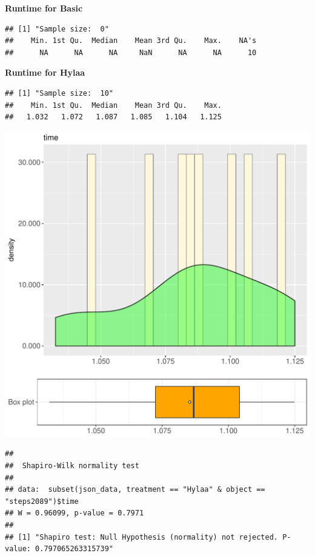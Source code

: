 \documentclass{article}\usepackage[]{graphicx}\usepackage[]{color}
\makeatletter
\def\maxwidth{ %
  \ifdim\Gin@nat@width>\linewidth
    \linewidth
  \else
    \Gin@nat@width
  \fi
}
\newenvironment{kframe}{%
 \def\at@end@of@kframe{}%
 \ifinner\ifhmode%
  \def\at@end@of@kframe{\end{minipage}}%
  \begin{minipage}{\columnwidth}%
 \fi\fi%
 \def\FrameCommand##1{\hskip\@totalleftmargin \hskip-\fboxsep
 \colorbox{shadecolor}{##1}\hskip-\fboxsep
     \hskip-\linewidth \hskip-\@totalleftmargin \hskip\columnwidth}%
 \MakeFramed {\advance\hsize-\width
   \@totalleftmargin\z@ \linewidth\hsize
   \@setminipage}}%
 {\par\unskip\endMakeFramed%
 \at@end@of@kframe}
\newenvironment{knitrout}{}{} %
\makeatother
\begin{document}
 \textbf{Runtime for Basic}
\begin{knitrout}
\color{fgcolor}\begin{kframe}
\begin{verbatim}
## [1] "Sample size:  0"
##    Min. 1st Qu.  Median    Mean 3rd Qu.    Max.    NA's 
##      NA      NA      NA     NaN      NA      NA      10
\end{verbatim}
\end{kframe}
\end{knitrout}
 \textbf{Runtime for Hylaa}
\begin{knitrout}
\color{fgcolor}\begin{kframe}
\begin{verbatim}
## [1] "Sample size:  10"
##    Min. 1st Qu.  Median    Mean 3rd Qu.    Max. 
##   1.032   1.072   1.087   1.085   1.104   1.125
\end{verbatim}
\end{kframe}
\includegraphics[width=\maxwidth]{figure/RH3_Hylaa_steps2089-1} 
\begin{kframe}\begin{verbatim}
## 
## 	Shapiro-Wilk normality test
## 
## data:  subset(json_data, treatment == "Hylaa" & object == "steps2089")$time
## W = 0.96099, p-value = 0.7971
## 
## [1] "Shapiro test: Null Hypothesis (normality) not rejected. P-value: 0.797065263315739"
\end{verbatim}
\end{kframe}
\end{knitrout}
  
\end{document}
